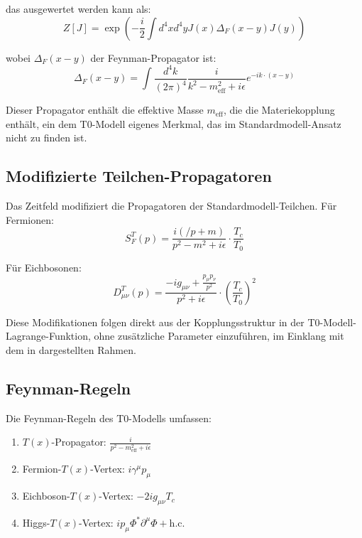 \documentclass[12pt,a4paper]{article}
\begin{document}
	das ausgewertet werden kann als:
	\begin{equation}
		Z[J] = \exp\left(-\frac{i}{2}\int d^4x d^4y J(x)\Delta_F(x-y)J(y)\right)
		\label{eq:evaluated_functional}
	\end{equation}
	
	wobei $\Delta_F(x-y)$ der Feynman-Propagator ist:
	\begin{equation}
		\Delta_F(x-y) = \int \frac{d^4k}{(2\pi)^4} \frac{i}{k^2 - m_{\text{eff}}^2 + i\epsilon} e^{-ik \cdot (x-y)}
		\label{eq:feynman_propagator}
	\end{equation}
	
	Dieser Propagator enthält die effektive Masse $m_{\text{eff}}$, die die Materiekopplung enthält, ein dem T0-Modell eigenes Merkmal, das im Standardmodell-Ansatz nicht zu finden ist.
	
	\subsection{Modifizierte Teilchen-Propagatoren}
	\label{subsec:modified_propagators}
	
	Das Zeitfeld modifiziert die Propagatoren der Standardmodell-Teilchen. Für Fermionen:
	\begin{equation}
		S_F^T(p) = \frac{i(\slash{p} + m)}{p^2 - m^2 + i\epsilon} \cdot \frac{T_c}{T_0}
		\label{eq:fermion_propagator}
	\end{equation}
	
	Für Eichbosonen:
	\begin{equation}
		D_{\mu\nu}^T(p) = \frac{-ig_{\mu\nu} + \frac{p_{\mu}p_{\nu}}{p^2}}{p^2 + i\epsilon} \cdot \left(\frac{T_c}{T_0}\right)^2
		\label{eq:gauge_propagator}
	\end{equation}
	
	Diese Modifikationen folgen direkt aus der Kopplungsstruktur in der T0-Modell-Lagrange-Funktion, ohne zusätzliche Parameter einzuführen, im Einklang mit dem in \cite{Pascher2025Lagrange} dargestellten Rahmen.
	
	\subsection{Feynman-Regeln}
	\label{subsec:feynman_rules}
	
	Die Feynman-Regeln des T0-Modells umfassen:
	
	\begin{enumerate}
		\item $T(x)$-Propagator: $\frac{i}{p^2 - m_{\text{eff}}^2 + i\epsilon}$
		\item Fermion-$T(x)$-Vertex: $i\gamma^{\mu}p_{\mu}$
		\item Eichboson-$T(x)$-Vertex: $-2ig_{\mu\nu}T_c$
		\item Higgs-$T(x)$-Vertex: $ip_{\mu}\Phi^*\partial^{\mu}\Phi + \text{h.c.}$
	\end{enumerate}
	
\end{document}
